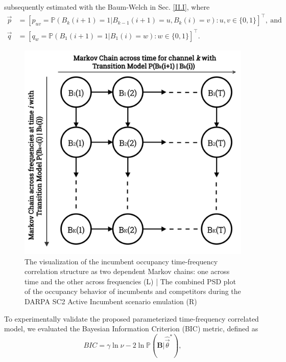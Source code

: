 \documentclass[12pt, draftcls, onecolumn]{IEEEtran}
\begin{document}
subsequently estimated with the Baum-Welch
in Sec. \ref{II.I},
where
\begin{equation}\label{7}
    \begin{aligned}
        \vec{p}&=[p_{uv}=\mathbb{P}(B_{k}(i+1)=1|B_{k-1}(i+1)=u,B_{k}(i)=v):u,v \in \{0,1\}]^{\intercal},\ \text{and}\\
        \vec{q}&=[q_{w}=\mathbb{P}(B_{1}(i+1)=1|B_{1}(i)=w):w \in \{0,1\}]^{\intercal}.
    \end{aligned}
\end{equation}
\begin{figure} [t]
    \centerline{
    \includegraphics[width = 1.0\linewidth]{figures/Minerva_Occupancy_Markov_Chain_Flipped.png}}
    \vspace{-6mm}
    \caption{The visualization of the incumbent occupancy time-frequency correlation structure as two dependent Markov chains: one across time and the other across frequencies (L) | The combined PSD plot of the occupancy behavior of incumbents and competitors during the DARPA SC2 Active Incumbent scenario emulation (R)}
    \label{fig:A.3}
    \vspace{-7mm}
\end{figure}
To experimentally validate the proposed parameterized time-frequency correlated model, we  evaluated the Bayesian Information Criterion (BIC) metric,
defined as
\begin{equation}
\label{BIC}
   BIC = \gamma \ln{\nu} - 2\ln{\mathbb{P}(\mathbf{B}|\hat{\vec{\theta}}^*)},
\end{equation}
\end{document}
